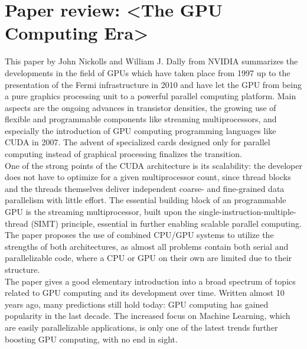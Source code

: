 \section{Paper review: <The GPU Computing Era>}
This paper by John Nickolls and William J. Dally from NVIDIA summarizes the developments in the field of GPUs which have taken place from 1997 up to the presentation of the Fermi infrastructure in 2010 and have let the GPU from being a pure graphics processing unit to a powerful parallel computing platform. Main aspects are the ongoing advances in transistor densities, the growing use of flexible and programmable components like streaming multiprocessors, and especially the introduction of GPU computing programming languages like CUDA in 2007. The advent of specialized cards designed only for parallel computing instead of graphical processing finalizes the transition.\\
One of the strong points of the CUDA architecture is its scalability: the developer does not have to optimize for a given multiprocessor count, since thread blocks and the threads themselves deliver independent coarse- and fine-grained data parallelism with little effort. The essential building block of an programmable GPU is the streaming multiprocessor, built upon the single-instruction-multiple-thread (SIMT) principle, essential in further enabling scalable parallel computing. The paper proposes the use of combined CPU/GPU systems to utilize the strengths of both architectures, as almost all problems contain both serial and parallelizable code, where a CPU or GPU on their own are limited due to their structure.\\
The paper gives a good elementary introduction into a broad spectrum of topics related to GPU computing and its development over time. Written almost 10 years ago, many predictions still hold today: GPU computing has gained popularity in the last decade. The increased focus on Machine Learning, which are easily parallelizable applications, is only one of the latest trends further boosting GPU computing, with no end in sight.